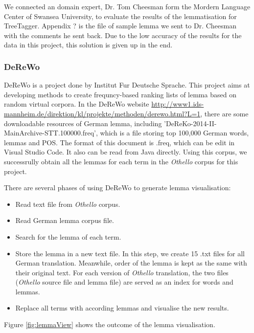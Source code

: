 We connected an domain expert, Dr. Tom Cheesman form the Mordern Language Center of Swansea University, to evaluate the results of the lemmatisation for TreeTagger. Appendix {?} is the file of sample lemma we sent to Dr. Cheesman with the comments he sent back. Due to the low accuracy of the results for the data in this project, this solution is given up in the end.

\subsubsection{DeReWo}

DeReWo is a project done by Institut Fur Deutsche Sprache. This project aims at developing methods to create frequncy-based ranking lists of lemma based on random virtual corpora. In the DeReWo website \url{http://www1.ids-mannheim.de/direktion/kl/projekte/methoden/derewo.html?L=1}, there are some downloadable resources of German lemma, including 'DeReKo-2014-II-MainArchive-STT.100000.freq', which is a file storing top 100,000 German words, lemmas and POS. The format of this document is .freq, which can be edit in Visual Studio Code. It also can be read from Java directly. Using this corpus, we successrully obtain all the lemmas for each term in the \emph{Othello} corpus for this project.

There are several phases of using DeReWo to generate lemma visualisation:
\begin{itemize}
	\item \textbf{} Read text file from \emph{Othello} corpus.	
	\item \textbf{} Read German lemma corpus file.
	\item \textbf{} Search for the lemma of each term.
	\item \textbf{} Store the lemma in a new text file. In this step, we create 15 .txt files for all German translation. Meanwhile, order of the lemma is kept as the same with their original text. For each version of \emph{Othello} translation, the two files (\emph{Othello} source file and lemma file) are served as an index for words and lemmas.
	\item \textbf{} Replace all terms with according lemmas and visualise the new results.
\end{itemize}	

Figure \ref{fig:lemmaView} shows the outcome of the lemma visualisation. 

